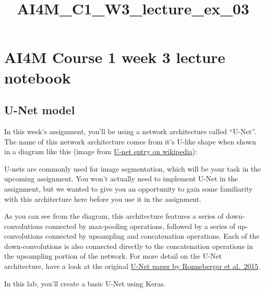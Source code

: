 \documentclass[11pt]{article}
\title{AI4M\_C1\_W3\_lecture\_ex\_03}
\begin{document}
    
    
    \maketitle
    
    

    
    \hypertarget{ai4m-course-1-week-3-lecture-notebook}{%
\section{AI4M Course 1 week 3 lecture
notebook}\label{ai4m-course-1-week-3-lecture-notebook}}

    \hypertarget{u-net-model}{%
\subsection{U-Net model}\label{u-net-model}}

In this week's assignment, you'll be using a network architecture called
``U-Net''. The name of this network architecture comes from it's U-like
shape when shown in a diagram like this (image from
\href{https://en.wikipedia.org/wiki/U-Net}{U-net entry on wikipedia}):

U-nets are commonly used for image segmentation, which will be your task
in the upcoming assignment. You won't actually need to implement U-Net
in the assignment, but we wanted to give you an opportunity to gain some
familiarity with this architecture here before you use it in the
assignment.

As you can see from the diagram, this architecture features a series of
down-convolutions connected by max-pooling operations, followed by a
series of up-convolutions connected by upsampling and concatenation
operations. Each of the down-convolutions is also connected directly to
the concatenation operations in the upsampling portion of the network.
For more detail on the U-Net architecture, have a look at the original
\href{https://arxiv.org/abs/1505.04597}{U-Net paper by Ronneberger et
al.~2015}.

In this lab, you'll create a basic U-Net using Keras.
\end{document}
